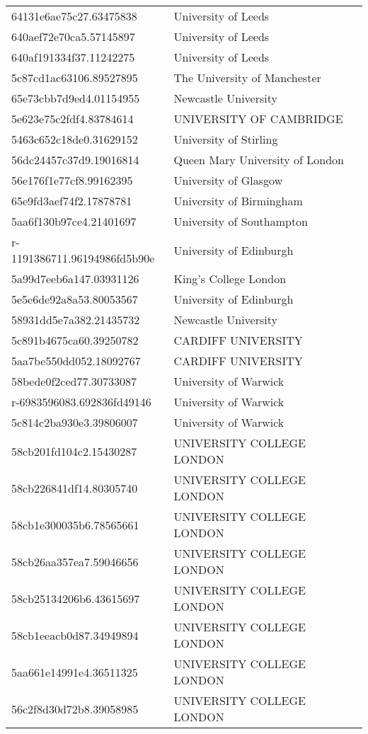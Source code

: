 \begin{tabular}{ll}
64131e6ae75c27.63475838 & University of Leeds \\
640aef72e70ca5.57145897 & University of Leeds \\
640af191334f37.11242275 & University of Leeds \\
5c87cd1ac63106.89527895 & The University of Manchester \\
65e73cbb7d9ed4.01154955 & Newcastle University \\
5e623e75c2fdf4.83784614 & UNIVERSITY OF CAMBRIDGE \\
5463c652c18de0.31629152 & University of Stirling \\
56dc24457c37d9.19016814 & Queen Mary University of London \\
56e176f1e77cf8.99162395 & University of Glasgow \\
65e9fd3aef74f2.17878781 & University of Birmingham \\
5aa6f130b97ce4.21401697 & University of Southampton \\
r-1191386711.96194986fd5b90e & University of Edinburgh \\
5a99d7eeb6a147.03931126 & King's College London \\
5e5e6de92a8a53.80053567 & University of Edinburgh \\
58931dd5e7a382.21435732 & Newcastle University \\
5c891b4675ca60.39250782 & CARDIFF UNIVERSITY \\
5aa7be550dd052.18092767 & CARDIFF UNIVERSITY \\
58bede0f2ced77.30733087 & University of Warwick \\
r-6983596083.692836fd49146 & University of Warwick \\
5c814c2ba930e3.39806007 & University of Warwick \\
58cb201fd104c2.15430287 & UNIVERSITY COLLEGE LONDON \\
58cb226841df14.80305740 & UNIVERSITY COLLEGE LONDON \\
58cb1e300035b6.78565661 & UNIVERSITY COLLEGE LONDON \\
58cb26aa357ea7.59046656 & UNIVERSITY COLLEGE LONDON \\
58cb25134206b6.43615697 & UNIVERSITY COLLEGE LONDON \\
58cb1eeacb0d87.34949894 & UNIVERSITY COLLEGE LONDON \\
5aa661e14991e4.36511325 & UNIVERSITY COLLEGE LONDON \\
56c2f8d30d72b8.39058985 & UNIVERSITY COLLEGE LONDON \\

\end{tabular}
